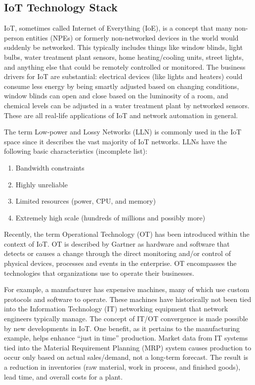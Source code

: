 \subsection{IoT Technology Stack}
IoT, sometimes called Internet of Everything (IoE), is a concept that many
non-person entities (NPEs) or formerly non-networked devices in the world
would suddenly be networked. This typically includes things like window
blinds, light bulbs, water treatment plant sensors, home heating/cooling
units, street lights, and anything else that could be remotely controlled or
monitored. The business drivers for IoT are substantial: electrical devices
(like lights and heaters) could consume less energy by being smartly adjusted
based on changing conditions, window blinds can open and close based on the
luminosity of a room, and chemical levels can be adjusted in a water treatment
plant by networked sensors. These are all real-life applications of IoT and
network automation in general.

The term Low-power and Lossy Networks (LLN) is commonly used in the IoT space
since it describes the vast majority of IoT networks. LLNs have the following
basic characteristics (incomplete list):

\begin{enumerate}
  \item	Bandwidth constraints
  \item	Highly unreliable
  \item	Limited resources (power, CPU, and memory)
  \item	Extremely high scale (hundreds of millions and possibly more)
\end{enumerate}

Recently, the term Operational Technology (OT) has been introduced within the
context of IoT. OT is described by Gartner as hardware and software that
detects or causes a change through the direct monitoring and/or control of
physical devices, processes and events in the enterprise. OT encompasses the
technologies that organizations use to operate their businesses.

For example, a manufacturer has expensive machines, many of which use custom
protocols and software to operate. These machines have historically not been
tied into the Information Technology (IT) networking equipment that network
engineers typically manage. The concept of IT/OT convergence is made possible
by new developments in IoT. One benefit, as it pertains to the manufacturing
example, helps enhance ``just in time'' production. Market data from IT
systems tied into the Material Requirement Planning (MRP) system causes
production to occur only based on actual sales/demand, not a long-term
forecast. The result is a reduction in inventories (raw material, work in
process, and finished goods), lead time, and overall costs for a plant.

